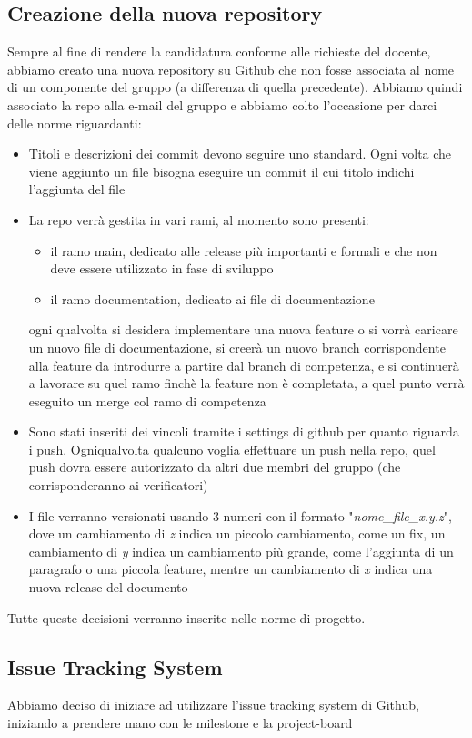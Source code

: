 \subsection{Creazione della nuova repository}
Sempre al fine di rendere la candidatura conforme alle richieste del docente, abbiamo creato una nuova repository su Github che non fosse associata al nome di un componente del gruppo (a differenza di quella precedente). Abbiamo quindi associato la repo alla e-mail del gruppo e abbiamo colto l'occasione per darci delle norme riguardanti:
\begin{itemize}
	\item Titoli e descrizioni dei commit devono seguire uno standard. Ogni volta che viene aggiunto un file bisogna eseguire un commit il cui titolo indichi l'aggiunta del file
	\item La repo verrà gestita in vari rami, al momento sono presenti:
	\begin{itemize}
 		\item il ramo main, dedicato alle release più importanti e formali e che non deve essere utilizzato in fase di sviluppo
		\item il ramo documentation, dedicato ai file di documentazione
	\end{itemize}
	ogni qualvolta si desidera implementare una nuova feature o si vorrà caricare un nuovo file di documentazione, si creerà un nuovo branch corrispondente alla feature da introdurre a partire dal branch di competenza, e si continuerà a lavorare su quel ramo finchè la feature non è completata, a quel punto verrà eseguito un merge col ramo di competenza
	\item Sono stati inseriti dei vincoli tramite i settings di github per quanto riguarda i push. Ogniqualvolta qualcuno voglia effettuare un push nella repo, quel push dovra essere autorizzato da altri due membri del gruppo (che corrisponderanno ai verificatori)
	\item I file verranno versionati usando 3 numeri con il formato "\textit{nome\_file\_x.y.z}", dove un cambiamento di \textit{z} indica un piccolo cambiamento, come un fix, un cambiamento di \textit{y} indica un cambiamento più grande, come l'aggiunta di un paragrafo o una piccola feature, mentre  un cambiamento di \textit{x} indica una nuova release del documento
\end{itemize}
Tutte queste decisioni verranno inserite nelle norme di progetto.

\subsection{Issue Tracking System}
Abbiamo deciso di iniziare ad utilizzare l'issue tracking system di Github, iniziando a prendere mano con le milestone e la project-board

